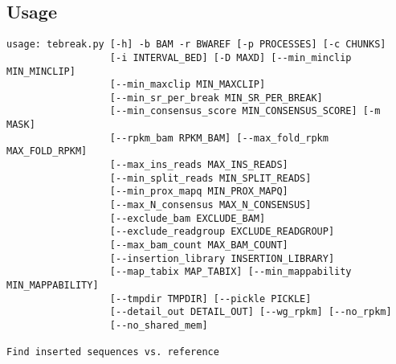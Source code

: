\documentclass[letterpaper,11pt]{article}
\begin{document}
\subsection{Usage}
\begin{verbatim}
usage: tebreak.py [-h] -b BAM -r BWAREF [-p PROCESSES] [-c CHUNKS]
                  [-i INTERVAL_BED] [-D MAXD] [--min_minclip MIN_MINCLIP]
                  [--min_maxclip MIN_MAXCLIP]
                  [--min_sr_per_break MIN_SR_PER_BREAK]
                  [--min_consensus_score MIN_CONSENSUS_SCORE] [-m MASK]
                  [--rpkm_bam RPKM_BAM] [--max_fold_rpkm MAX_FOLD_RPKM]
                  [--max_ins_reads MAX_INS_READS]
                  [--min_split_reads MIN_SPLIT_READS]
                  [--min_prox_mapq MIN_PROX_MAPQ]
                  [--max_N_consensus MAX_N_CONSENSUS]
                  [--exclude_bam EXCLUDE_BAM]
                  [--exclude_readgroup EXCLUDE_READGROUP]
                  [--max_bam_count MAX_BAM_COUNT]
                  [--insertion_library INSERTION_LIBRARY]
                  [--map_tabix MAP_TABIX] [--min_mappability MIN_MAPPABILITY]
                  [--tmpdir TMPDIR] [--pickle PICKLE]
                  [--detail_out DETAIL_OUT] [--wg_rpkm] [--no_rpkm]
                  [--no_shared_mem]

Find inserted sequences vs. reference


\end{verbatim}
\end{document}
